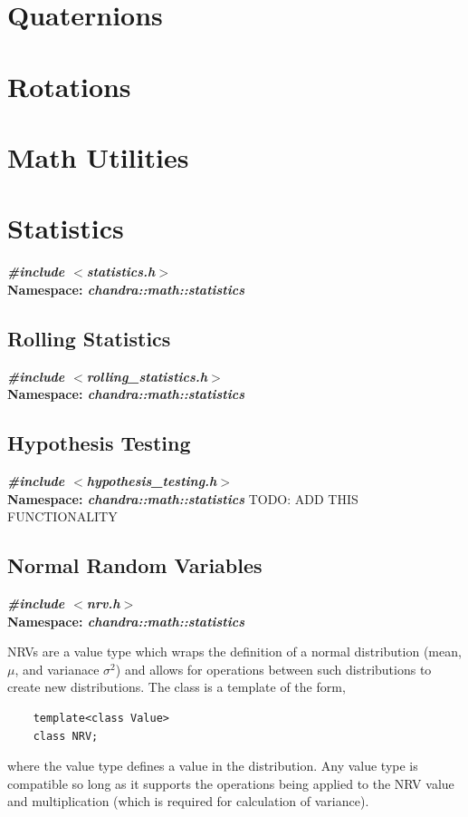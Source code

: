 \documentclass[10pt,letterpaper]{memoir} %
\newcommand{\apiheader}[2]{\noindent{}\textbf{\emph{\#include $<$#1$>$}}\\\noindent{}\textbf{Namespace: \emph{#2}}}
\begin{document}
\section{Quaternions}
\section{Rotations}
\section{Math Utilities}

\section{Statistics}
\label{sec:math:statistics}
\apiheader{statistics.h}{chandra::math::statistics}

\subsection{Rolling Statistics}
\apiheader{rolling\_statistics.h}{chandra::math::statistics}

\subsection{Hypothesis Testing}
\apiheader{hypothesis\_testing.h}{chandra::math::statistics}
TODO: ADD THIS FUNCTIONALITY
 
\subsection{Normal Random Variables}
\apiheader{nrv.h}{chandra::math::statistics}

NRVs are a value type which wraps the definition of a normal distribution (mean, $\mu$, and varianace $\sigma^2$) and allows for operations between such distributions to create new distributions.  The class is a template of the form,
\begin{verbatim}
	template<class Value>
	class NRV;
\end{verbatim}
where the value type defines a value in the distribution.  Any value type is compatible so long as it supports the operations being applied to the NRV value and multiplication (which is required for calculation of variance).
\end{document}
